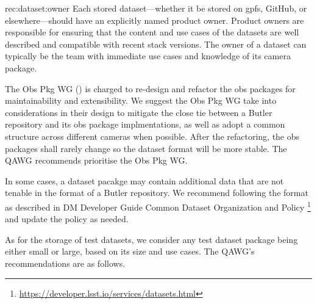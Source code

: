 \begin{recommendation}
    {rec:dataset:owner}
    {Each stored dataset---whether it be stored on \gls{gpfs}, GitHub, or
    elsewhere---should have an explicitly named product owner.}
Product owners are responsible for ensuring that the content and
use cases of the datasets are well described and compatible with
recent stack versions.  The owner of a dataset can typically be the
team with immediate use cases and knowledge of its camera package.
\end{recommendation}

The Obs Pkg WG () is charged to re-design and refactor
the obs packages for maintainability and extensibility. We suggest
the Obs Pkg WG take into considerations in their design to mitigate
the close tie between a Butler repository and its obs package
implmentations, as well as adopt a common structure across different
cameras when possible.  After the refactoring, the obs packages
shall rarely change so the dataset format will be more stable.  The
QAWG recommends prioritise the Obs Pkg WG.

In some cases, a dataset pacakge may contain additional data that are not
tenable in the format of a Butler repository. We recommend following the
format as described in DM Developer Guide Common Dataset Organization
and Policy \footnote{\url{https://developer.lsst.io/services/datasets.html}}
and update the policy as needed.

As for the storage of test datasets, we consider any test dataset
package being either small or large, based on its size and use cases.
The QAWG's recommendations are as follows.

